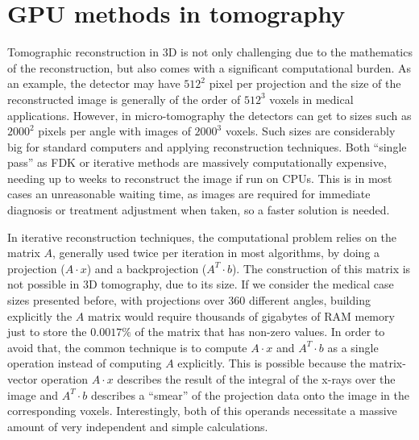 
\chapter{GPU methods in tomography}

Tomographic reconstruction in 3D is not only challenging due to the mathematics of the reconstruction, but also comes with a significant computational burden. As an example, the detector may have $512^2$ pixel per projection and the size of the reconstructed image is generally of the order of $512^3$ voxels in medical applications. However, in micro-tomography the detectors can get to sizes such as $2000^2$ pixels per angle with images of $2000^3$ voxels. Such sizes are considerably big for standard computers and applying reconstruction techniques. Both ``single pass'' as FDK or iterative methods are massively computationally expensive, needing up to weeks to reconstruct the image if run on CPUs. This is in most cases an unreasonable waiting time, as images are required for immediate  diagnosis or treatment adjustment when taken, so a faster solution is needed.

In iterative reconstruction techniques, the computational problem relies on the matrix $A$, generally used twice per iteration in most algorithms, by doing a projection ($A\cdot x$) and a backprojection ($A^T\cdot b$). The construction of this matrix is not possible in 3D tomography, due to its size. If we consider the medical case sizes presented before, with projections over 360 different angles, building explicitly the $A$ matrix would require thousands of gigabytes of RAM memory just to store the $0.0017\%$ of the matrix that has non-zero values. In order to avoid that, the common technique is to compute $A\cdot x$ and $A^T\cdot b$ as a single operation instead of computing $A$ explicitly. This is possible because the matrix-vector operation $A\cdot x$ describes the result of the integral of the x-rays over the image and $A^T\cdot b$ describes a ``smear'' of the projection data onto the image in the corresponding voxels. Interestingly, both of this operands necessitate a massive amount of very independent and simple calculations.

